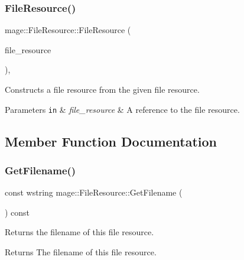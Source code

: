 \subsubsection{\texorpdfstring{File\+Resource()}{FileResource()}\hspace{0.1cm}{\footnotesize\ttfamily [3/3]}}
{\footnotesize\ttfamily mage\+::\+File\+Resource\+::\+File\+Resource (\begin{DoxyParamCaption}\item[{\hyperlink{classmage_1_1_file_resource}{File\+Resource} \&\&}]{file\+\_\+resource }\end{DoxyParamCaption})\hspace{0.3cm}{\ttfamily [private]}, {\ttfamily [delete]}}

Constructs a file resource from the given file resource.


\begin{DoxyParams}[1]{Parameters}
\mbox{\tt in}  & {\em file\+\_\+resource} & A reference to the file resource. \\
\hline
\end{DoxyParams}


\subsection{Member Function Documentation}
\hypertarget{classmage_1_1_file_resource_acdd02b3c226777fd003d8f56e0a5cc83}{}\label{classmage_1_1_file_resource_acdd02b3c226777fd003d8f56e0a5cc83} 
\subsubsection{\texorpdfstring{Get\+Filename()}{GetFilename()}}
{\footnotesize\ttfamily const wstring mage\+::\+File\+Resource\+::\+Get\+Filename (\begin{DoxyParamCaption}{ }\end{DoxyParamCaption}) const}

Returns the filename of this file resource.

\begin{DoxyReturn}{Returns}
The filename of this file resource. 
\end{DoxyReturn}
\hypertarget{classmage_1_1_file_resource_a8bc3308e018b352157bbcfe3a85519f9}{}\label{classmage_1_1_file_resource_a8bc3308e018b352157bbcfe3a85519f9} 
